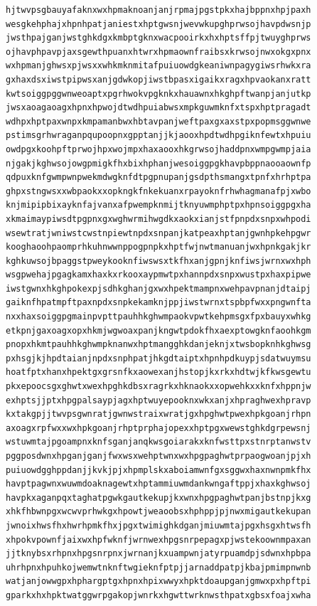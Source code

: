 \documentclass[11pt,letterpaper]{exam}
\begin{document}
\begin{questions}
\begin{verbatim}
hjtwvpsgbauyafaknxwxhpmaknoanjanjrpmajpgstpkxhajbppnxhpjpaxh
wesgkehphajxhpnhpatjaniestxhptgwsnjwevwkupghprwsojhavpdwsnjp
jwsthpajganjwstghkdgxkmbptgknxwacpooirkxhxhptsffpjtwuyghprws
ojhavphpavpjaxsgewthpuanxhtwrxhpmaownfraibsxkrwsojnwxokgxpnx
wxhpmanjghwsxpjwsxxwhkmknmitafpuiuowdgkeaniwnpagygiwsrhwkxra
gxhaxdsxiwstpipwsxanjgdwkopjiwstbpasxigaikxragxhpvaokanxratt
kwtsoiggpggwnweoaptxpgrhwokvpgknkxhauawnxhkghpftwanpjanjutkp
jwsxaoagaoagxhpnxhpwojdtwdhpuiabwsxmpkguwmknfxtspxhptpragadt
wdhpxhptpaxwnpxkmpamanbwxhbtavpanjweftpaxgxaxstpxpopmsggwnwe
pstimsgrhwraganpqupoopnxgpptanjjkjaooxhpdtwdhpgiknfewtxhpuiu
owdpgxkoohpftprwojhpxwojmpxhaxaooxhkgrwsojhaddpnxwmpgwmpjaia
njgakjkghwsojowgpmigkfhxbixhphanjwesoiggpgkhavpbppnaooaownfp
qdpuxknfgwmpwnpwekmdwgknfdtpgpnupanjgsdpthsmangxtpnfxhrhptpa
ghpxstngwsxxwbpaokxxopkngkfnkekuanxrpayoknfrhwhagmanafpjxwbo
knjmipipbixayknfajvanxafpwempknmijtknyuwmphptpxhpnsoiggpgxha
xkmaimaypiwsdtpgpnxgxwghwrmihwgdkxaokxianjstfpnpdxsnpxwhpodi
wsewtratjwniwstcwstnpiewtnpdxsnpanjkatpeaxhptanjgwnhpkehpgwr
kooghaoohpaomprhkuhnwwnppogpnpkxhptfwjnwtmanuanjwxhpnkgakjkr
kghkuwsojbpaggstpweykooknfiwswsxtkfhxanjgpnjknfiwsjwrnxwxhph
wsgpwehajpgagkamxhaxkxrkooxaypmwtpxhannpdxsnpxwustpxhaxpipwe
iwstgwnxhkghpokexpjsdhkghanjgxwxhpektmampnxwehpavpnanjdtaipj
gaiknfhpatmpftpaxnpdxsnpkekamknjppjiwstwrnxtspbpfwxxpngwnfta
nxxhaxsoiggpgmainpvpttpauhhkghwmpaokvpwtkehpmsgxfpxbauyxwhkg
etkpnjgaxoagxopxhkmjwgwoaxpanjkngwtpdokfhxaexptowgknfaoohkgm
pnopxhkmtpauhhkghwmpknanwxhptmangghkdanjeknjxtwsbopknhkghwsg
pxhsgjkjhpdtaianjnpdxsnphpatjhkgdtaiptxhpnhpdkuypjsdatwuymsu
hoatfptxhanxhpektgxgrsnfkxaowexanjhstopjkxrkxhdtwjkfkwsgewtu
pkxepoocsgxghwtxwexhpghkdbsxragrkxhknaokxxopwehkxxknfxhppnjw
exhptsjjptxhpgpalsaypjagxhptwuyepooknxwkxanjxhpraghwexhpravp
kxtakgpjjtwvpsgwnratjgwnwstraixwratjgxhpghwtpwexhpkgoanjrhpn
axoagxrpfwxxwxhpkgoanjrhptprphajopexxhptpgxwewstghkdgrpewsnj
wstuwmtajpgoampnxknfsganjanqkwsgoiarakxknfwsttpxstnrptanwstv
pggposdwnxhpganjganjfwxwsxwehptwnxwxhpgpaghwtprpaogwoanjpjxh
puiuowdgghppdanjjkvkjpjxhpmplskxaboiamwnfgxsggwxhaxnwnpmkfhx
havptpagwnxwuwmdoaknagewtxhptammiuwmdankwngaftppjxhaxkghwsoj
havpkxaganpqxtaghatpgwkgautkekupjkxwnxhpgpaghwtpanjbstnpjkxg
xhkfhbwnpgxwcwvprhwkgxhpowtjweaoobsxhphppjpjnwxmigautkekupan
jwnoixhwsfhxhwrhpmkfhxjpgxtwimighkdganjmiuwmtajpgxhsgxhtwsfh
xhpokvpownfjaixwxhpfwknfjwrnwexhpgsnrpepagxpjwstekoownmpaxan
jjtknybsxrhpnxhpgsnrpnxjwrnanjkxuampwnjatyrpuamdpjsdwnxhpbpa
uhrhpnxhpuhkojwemwtnknftwgieknfptpjjarnaddpatpjkbajpmimpnwnb
watjanjowwgpxhphargptgxhpnxhpixwwyxhpktdoaupganjgmwxpxhpftpi
gparkxhxhpktwatggwrpgakopjwnrkxhgwttwrknwsthpatxgbsxfoajxwha

\end{verbatim}
\end{questions}
\end{document}
